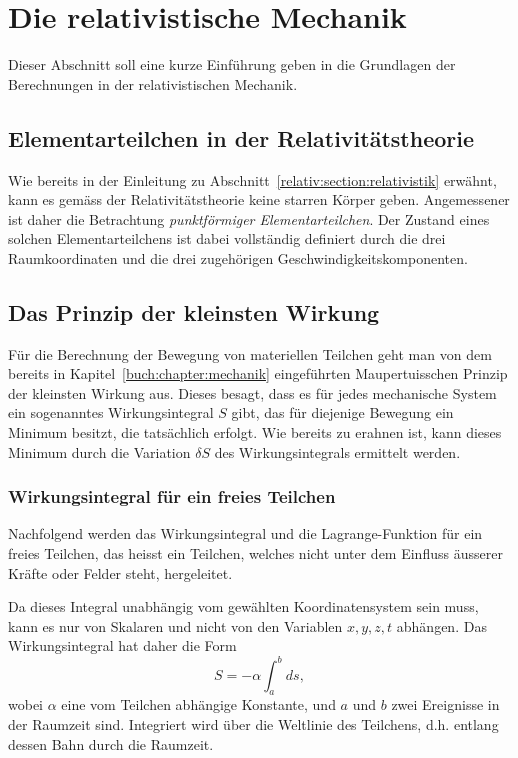 
\section{Die relativistische Mechanik
\label{relativ:section:rel-mech}}

Dieser Abschnitt soll eine kurze Einführung geben in die
Grundlagen der Berechnungen in der relativistischen Mechanik.


\subsection{Elementarteilchen in der Relativitätstheorie
\label{relativ:section:elementarteilchen}}
Wie bereits in der Einleitung zu Abschnitt~\ref{relativ:section:relativistik} erwähnt,
kann es gemäss der Relativitätstheorie keine starren Körper geben.
Angemessener ist daher die Betrachtung \emph{punktförmiger Elementarteilchen}.
%
Der Zustand eines solchen Elementarteilchens ist dabei vollständig definiert durch
die drei Raumkoordinaten und die drei zugehörigen Geschwindigkeitskomponenten.


\subsection{Das Prinzip der kleinsten Wirkung
\label{relativ:section:kleinste-wirkung}}

Für die Berechnung der Bewegung von materiellen Teilchen geht man
von dem bereits in Kapitel~\ref{buch:chapter:mechanik} eingeführten
Maupertuisschen Prinzip der kleinsten Wirkung aus.
Dieses besagt, dass es für jedes mechanische System ein sogenanntes
Wirkungsintegral \(S\) gibt,
das für diejenige Bewegung ein Minimum besitzt, die tatsächlich erfolgt.
Wie bereits zu erahnen ist, kann dieses Minimum durch die Variation \(\delta S\)
des Wirkungsintegrals ermittelt werden.

\subsubsection{Wirkungsintegral für ein freies Teilchen
\label{relativ:section:wirk-int-freies-teilchen}}

Nachfolgend werden das Wirkungsintegral und die Lagrange-Funktion
für ein freies Teilchen, das heisst ein Teilchen, welches nicht
unter dem Einfluss äusserer Kräfte oder Felder steht, hergeleitet.

Da dieses Integral unabhängig vom gewählten Koordinatensystem sein muss,
kann es nur von Skalaren und nicht von den Variablen \(x, y, z, t\) abhängen.
Das Wirkungsintegral hat daher die Form
\begin{equation}
    S = - \alpha \int_{a}^{b} ds,
\label{relativ:eqn:wirk-int-grundform}
\end{equation}
wobei \(\alpha\) eine vom Teilchen abhängige Konstante,
und \(a\) und \(b\) zwei Ereignisse in der Raumzeit sind.
Integriert wird über die Weltlinie des Teilchens,
d.h. entlang dessen Bahn durch die Raumzeit.

